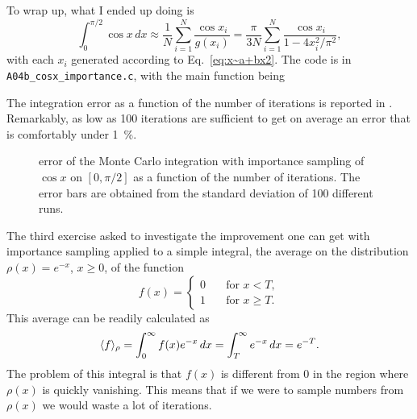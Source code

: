 To wrap up, what I ended up doing is
\begin{equation}
    \int_{0}^{\pi/2} \cos x \, dx \approx \frac{1}{N} \sum_{i = 1}^{N}
    \frac{\cos x_{i}}{g(x_{i})} = \frac{\pi}{3N} \sum_{i = 1}^{N} \frac{\cos
    x_{i}}{1 - 4 x_{i}^{2} / \pi^{2}},
\end{equation}
with each $x_i$ generated according to Eq.~\eqref{eq:x~a+bx2}. The code is in
\texttt{A04b\_cosx\_importance.c}, with the main function being

The integration error as a function of the number of iterations is reported in
. Remarkably, as low as \num{100} iterations are sufficient to
get on average an error that is comfortably under \qty{1}{\percent}.

\begin{figure}
    \centering
    
    \caption{error of the Monte Carlo integration with importance sampling of
        $\cos x$ on $[0, \pi/2]$ as a function of the number of iterations. The
        error bars are obtained from the standard deviation of \num{100}
        different runs.}
    \label{fig:A04b}
\end{figure}

The third exercise asked to investigate the improvement one can get with
importance sampling applied to a simple integral, the average on the
distribution $\rho(x) = e^{-x}$, $x \geq 0$, of the function
\begin{equation}
    f(x) =
    \begin{cases}
        0 &\quad \text{for } x < T, \\
        1 &\quad \text{for } x \geq T.
    \end{cases}
\end{equation}
This average can be readily calculated as
\begin{equation}
    \langle f\rangle_{\rho} = \int_{0}^{\infty} f(x) e^{-x} \, dx = \int_{T}^{\infty}
    e^{-x}\, dx = e^{-T}.
\end{equation}
The problem of this integral is that $f(x)$ is different from $0$ in the region
where $\rho(x)$ is quickly vanishing. This means that if we were to sample
numbers from $\rho(x)$ we would waste a lot of iterations.

